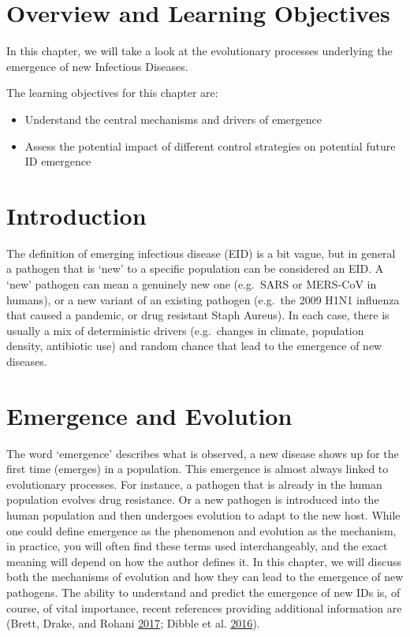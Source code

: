 \documentclass[]{book}
\providecommand{\tightlist}{%
  \setlength{\itemsep}{0pt}\setlength{\parskip}{0pt}}
\theoremstyle{definition}
\theoremstyle{definition}
\theoremstyle{definition}
\theoremstyle{remark}
\begin{document}
\section{Overview and Learning
Objectives}\label{overview-and-learning-objectives-15}

In this chapter, we will take a look at the evolutionary processes
underlying the emergence of new Infectious Diseases.

The learning objectives for this chapter are:

\begin{itemize}
\tightlist
\item
  Understand the central mechanisms and drivers of emergence
\item
  Assess the potential impact of different control strategies on
  potential future ID emergence
\end{itemize}

\section{Introduction}\label{introduction-15}

The definition of emerging infectious disease (EID) is a bit vague, but
in general a pathogen that is `new' to a specific population can be
considered an EID. A `new' pathogen can mean a genuinely new one
(e.g.~SARS or MERS-CoV in humans), or a new variant of an existing
pathogen (e.g.~the 2009 H1N1 influenza that caused a pandemic, or drug
resistant Staph Aureus). In each case, there is usually a mix of
deterministic drivers (e.g.~changes in climate, population density,
antibiotic use) and random chance that lead to the emergence of new
diseases.

\section{Emergence and Evolution}\label{emergence-and-evolution}

The word `emergence' describes what is observed, a new disease shows up
for the first time (emerges) in a population. This emergence is almost
always linked to evolutionary processes. For instance, a pathogen that
is already in the human population evolves drug resistance. Or a new
pathogen is introduced into the human population and then undergoes
evolution to adapt to the new host. While one could define emergence as
the phenomenon and evolution as the mechanism, in practice, you will
often find these terms used interchangeably, and the exact meaning will
depend on how the author defines it. In this chapter, we will discuss
both the mechanisms of evolution and how they can lead to the emergence
of new pathogens. The ability to understand and predict the emergence of
new IDs is, of course, of vital importance, recent references providing
additional information are (Brett, Drake, and Rohani
\protect\hyperlink{ref-brett17}{2017}; Dibble et al.
\protect\hyperlink{ref-dibble16}{2016}).
\end{document}
